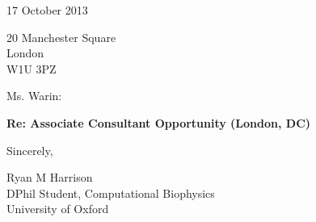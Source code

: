 \documentclass{../res}
\begin{document}
 
\begin{sloppypar}
 
 

\address{2115 Cloville Avenue\\
         Baltimore, MD 21214\\
         \texttt{+}1 443 257 5953}
\address{\texttt{ryan.m.harrison@gmail.com}\\
         \texttt{linkedin.com/in/rmharri}\\
         \texttt{github.com/rmharrison}}
\address{Wolfson College\\ 
         Oxford OX2 6UD\\
         \texttt{+}44 07523 229446}

\begin{resume} 
\setlength{\parskip}{1.00ex}
\setlength{\parindent}{0pt}
 
\vspace{2\baselineskip}

17 October 2013
\vspace{1\baselineskip}

20 Manchester Square \\
London \\
W1U 3PZ
\vspace{2\baselineskip}

Ms. Warin:

\bigskip

\textbf{Re: Associate Consultant Opportunity (London, DC)}

\bigskip



\vspace{2\baselineskip}
Sincerely,
\vspace{4\baselineskip}

Ryan M Harrison \\
DPhil Student, Computational Biophysics\\
University of Oxford \\


\end{resume} 
\end{sloppypar}
\end{document}
